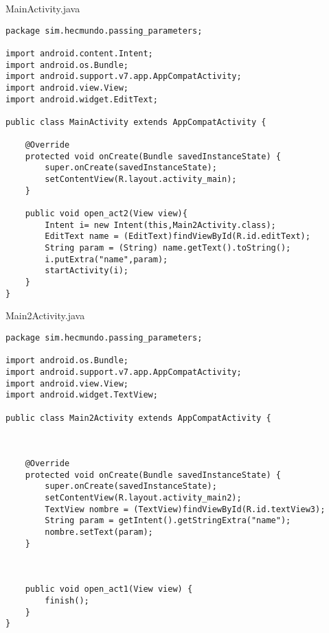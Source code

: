 \documentclass{report}
\begin{document}
MainActivity.java
\begin{lstlisting}
package sim.hecmundo.passing_parameters;

import android.content.Intent;
import android.os.Bundle;
import android.support.v7.app.AppCompatActivity;
import android.view.View;
import android.widget.EditText;

public class MainActivity extends AppCompatActivity {

    @Override
    protected void onCreate(Bundle savedInstanceState) {
        super.onCreate(savedInstanceState);
        setContentView(R.layout.activity_main);
    }

    public void open_act2(View view){
        Intent i= new Intent(this,Main2Activity.class);
        EditText name = (EditText)findViewById(R.id.editText);
        String param = (String) name.getText().toString();
        i.putExtra("name",param);
        startActivity(i);
    }
}
\end{lstlisting}	

Main2Activity.java
\begin{lstlisting}
package sim.hecmundo.passing_parameters;

import android.os.Bundle;
import android.support.v7.app.AppCompatActivity;
import android.view.View;
import android.widget.TextView;

public class Main2Activity extends AppCompatActivity {



    @Override
    protected void onCreate(Bundle savedInstanceState) {
        super.onCreate(savedInstanceState);
        setContentView(R.layout.activity_main2);
        TextView nombre = (TextView)findViewById(R.id.textView3);
        String param = getIntent().getStringExtra("name");
        nombre.setText(param);
    }



    public void open_act1(View view) {
        finish();
    }
}
\end{lstlisting}
\end{document}
